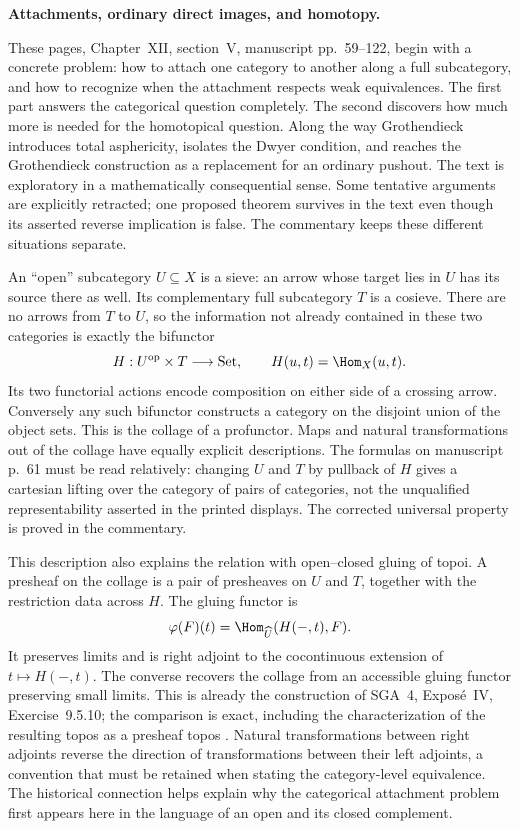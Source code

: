 \begingroup
{}
\noindent\textbf{Attachments, ordinary direct images, and homotopy.}

These pages, Chapter~XII, section~V, manuscript pp.~59--122, begin with a concrete problem: how to attach one category to another along a full subcategory, and how to recognize when the attachment respects weak equivalences. The first part answers the categorical question completely. The second discovers how much more is needed for the homotopical question. Along the way Grothendieck introduces total asphericity, isolates the Dwyer condition, and reaches the Grothendieck construction as a replacement for an ordinary pushout. The text is exploratory in a mathematically consequential sense. Some tentative arguments are explicitly retracted; one proposed theorem survives in the text even though its asserted reverse implication is false. The commentary keeps these different situations separate.

An ``open'' subcategory $U\subseteq X$ is a sieve: an arrow whose target lies in $U$ has its source there as well. Its complementary full subcategory $T$ is a cosieve. There are no arrows from $T$ to $U$, so the information not already contained in these two categories is exactly the bifunctor
\[
 H:U^{\mathrm{op}}\times T\longrightarrow\mathrm{Set},
 \qquad H(u,t)=\Hom_X(u,t).
\]
Its two functorial actions encode composition on either side of a crossing arrow. Conversely any such bifunctor constructs a category on the disjoint union of the object sets. This is the collage of a profunctor. Maps and natural transformations out of the collage have equally explicit descriptions. The formulas on manuscript p.~61 must be read relatively: changing $U$ and $T$ by pullback of $H$ gives a cartesian lifting over the category of pairs of categories, not the unqualified representability asserted in the printed displays. The corrected universal property is proved in the commentary.

This description also explains the relation with open--closed gluing of topoi. A presheaf on the collage is a pair of presheaves on $U$ and $T$, together with the restriction data across $H$. The gluing functor is
\[
 \varphi(F)(t)=\Hom_{\widehat U}(H(-,t),F).
\]
It preserves limits and is right adjoint to the cocontinuous extension of $t\mapsto H(-,t)$. The converse recovers the collage from an accessible gluing functor preserving small limits. This is already the construction of SGA~4, Expos\'e~IV, Exercise~9.5.10; the comparison is exact, including the characterization of the resulting topos as a presheaf topos \citep{SGA4I1972}. Natural transformations between right adjoints reverse the direction of transformations between their left adjoints, a convention that must be retained when stating the category-level equivalence. The historical connection helps explain why the categorical attachment problem first appears here in the language of an open and its closed complement.

